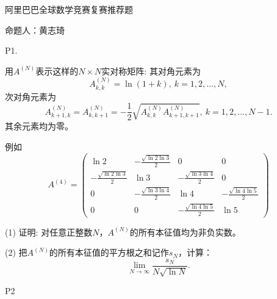 \documentclass[12pt,CJK]{article}
\begin{document}
\bch

{\large 阿里巴巴全球数学竞赛复赛推荐题}

\skipline

{命题人：黄志琦}

\skiplines

\bitem
\item[P1.]{
用$A^{(N)}$表示这样的$N\times N$实对称矩阵: 其对角元素为
$$A^{(N)}_{k,k}= \ln (1+k), \ k=1,2,\ldots, N,$$
次对角元素为
$$A^{(N)}_{k+1,k}=A_{k,k+1}^{(N)}=-\frac{1}{2}\sqrt{A^{(N)}_{k,k}A^{(N)}_{k+1,k+1}},\ k=1,2,\ldots, N-1.$$
其余元素均为零。

例如
$$ A^{(4)} = 
\begin{pmatrix}
\ln 2 & -\frac{\sqrt{\ln 2 \ln 3}}{2} & 0 & 0 \\
-\frac{\sqrt{\ln 2 \ln 3}}{2} & \ln 3 & -\frac{\sqrt{\ln 3 \ln 4}}{2} & 0 \\
0 & -\frac{\sqrt{\ln 3 \ln 4}}{2} & \ln 4 & -\frac{\sqrt{\ln 4 \ln 5}}{2} \\
0 & 0 &  -\frac{\sqrt{\ln 4 \ln 5}}{2} & \ln 5
\end{pmatrix}
$$
\bitem
\item[(1)]{ 证明: 对任意正整数$N$，$A^{(N)}$的所有本征值均为非负实数。}
\item[(2)]{ 把$A^{(N)}$的所有本征值的平方根之和记作$s_N$，计算：
    $$\lim_{N\rightarrow \infty} \frac{s_N}{N\sqrt{\ln N}}.$$}
\eitem
}

\item[P2]{
    

  }

\eitem




\ech
\end{document}

